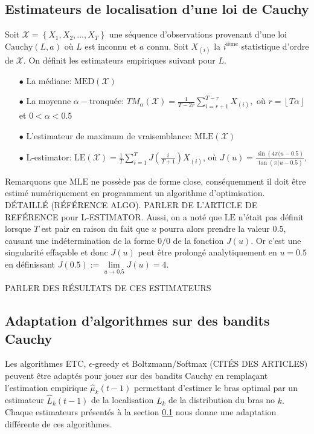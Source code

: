 \documentclass{article}
\begin{document}
\subsection{Estimateurs de localisation d'une loi de Cauchy}
\label{sous-section: Estimateurs Cauchy} 
Soit $\mathcal{X}=\left\{X_1,X_2,...,X_T\right\}$ une séquence d'observations provenant d'une loi $\mathrm{Cauchy}(L,a)$ où $L$ est inconnu et $a$ connu. Soit $X_{(i)}$ la $i^\text{ième}$ statistique d'ordre de $\mathcal{X}.$  On définit les estimateurs empiriques suivant pour $L.$

\begin{itemize}
\item[$\bullet$] La médiane: $\mathrm{MED}(\mathcal{X})$

\item[$\bullet$] La moyenne $\alpha-$tronquée: $\displaystyle TM_{\alpha}(\mathcal X)=\frac{1}{T-2r}\sum_{i=r+1}^{T-r}X_{(i)},$ où $r=\left\lfloor T \alpha\right\rfloor$ et $0<\alpha<0.5$

\item[$\bullet$] L'estimateur de maximum de vraisemblance: $\mathrm{MLE}(\mathcal{X})$

\item[$\bullet$] L-estimator: $\displaystyle\mathrm{LE}(\mathcal{X})=\frac{1}{T}\sum_{i=1}^T J\left(\frac{i}{T+1}\right) X_{(i)}$, où $J(u)=\frac{\sin\left(4\pi(u-0.5\right)}{\tan\left(\pi(u-0.5\right)},$

\end{itemize}

Remarquons que $\mathrm{MLE}$ ne possède pas de forme close, conséquemment il doit être estimé numériquement en programment un algorithme d'optimisation. DÉTAILLÉ (RÉFÉRENCE ALGO).  PARLER DE L'ARTICLE DE REFÉRENCE pour L-ESTIMATOR. Aussi, on a noté que $\mathrm{LE}$ n'était pas définit lorsque $T$ est pair en raison du fait que $u$ pourra alors prendre la valeur 0.5, causant une indétermination de la forme $0/0$ de la fonction $J(u).$ Or c'est une singularité effaçable et donc $J(u)$ peut être prolongé analytiquement en $u=0.5$ en définissant $J(0.5):=\lim\limits_{u \to 0.5} J(u) = 4.$  

PARLER DES RÉSULTATS DE CES ESTIMATEURS

\subsection{Adaptation d'algorithmes sur des bandits Cauchy}
Les algorithmes ETC, $\epsilon$-greedy et Boltzmann/Softmax (CITÉS DES ARTICLES) peuvent être adaptés pour jouer sur des bandits Cauchy en remplaçant l'estimation empirique $\hat{\mu}_k(t-1)$ permettant d'estimer le bras optimal par un estimateur $\widehat{L}_k(t-1)$ de la localisation $L_k$ de la distribution du bras no $k.$ Chaque estimateurs présentés à la section \ref{sous-section: Estimateurs Cauchy} nous donne une adaptation différente de ces algorithmes.
\end{document}

